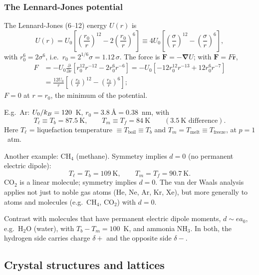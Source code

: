 \subsubsection*{The Lennard-Jones potential}

The Lennard-Jones (6--12) energy $U(r)$ is
\begin{equation}
  U(r) = U_0\left[\left(\frac{r_0}{r}\right)^{12}-2\left(\frac{r_0}{r}\right)^{6}\right]
       \equiv 4U_0\left[\left(\frac{\sigma}{r}\right)^{12}-\left(\frac{\sigma}{r}\right)^{6}\right],
\end{equation}
with $r_0^6 = 2\sigma^6$, i.e.\ $r_0 = 2^{1/6}\sigma = 1.12\,\sigma$. The force is
$\mathbf{F} = -\boldsymbol{\nabla}U$; with $\mathbf{F} = F\hat{\mathbf{r}}$,
\begin{align}
  F &= -U_0\frac{\partial}{\partial r}\left[r_0^{12}r^{-12}-2r_0^6r^{-6}\right]
     = -U_0\left[-12r_0^{12}r^{-13}+12r_0^6r^{-7}\right]\nonumber\\
    &= \frac{12U_0}{r}\left[\left(\frac{r_0}{r}\right)^{12}-\left(\frac{r_0}{r}\right)^{6}\right];
\end{align}
$F = 0$ at $r = r_0$, the minimum of the potential.

E.g.\ Ar: $U_0/k_{B} = 120$~K, $r_0 = 3.8\ \text{\AA} = 0.38$~nm, with
\begin{equation*}
  T_\ell\equiv T_b = 87.5\ \text{K},\qquad T_m\equiv T_f = 84\ \text{K}
  \qquad(3.5\ \text{K difference}).
\end{equation*}
Here $T_\ell$ = liquefaction temperature $\equiv T_{\text{boil}}\equiv T_b$ and
$T_m = T_{\text{melt}}\equiv T_{\text{freeze}}$, at $p = 1$~atm.

Another example: CH$_4$ (methane). Symmetry implies $d = 0$ (no permanent electric
dipole):
\begin{equation*}
  T_\ell = T_b = 109\ \text{K},\qquad T_m = T_f = 90.7\ \text{K}.
\end{equation*}
CO$_2$ is a linear molecule; symmetry implies $d = 0$. The van der Waals analysis applies
not just to noble gas atoms (He, Ne, Ar, Kr, Xe), but more generally to atoms and
molecules (e.g.\ CH$_4$, CO$_2$) with $d = 0$.

Contrast with molecules that have permanent electric dipole moments, $d\sim ea_0$, e.g.\
H$_2$O (water), with $T_b - T_m = 100$~K, and ammonia NH$_3$. In both, the hydrogen side
carries charge $\delta+$ and the opposite side $\delta-$.

\subsection{Crystal structures and lattices}

